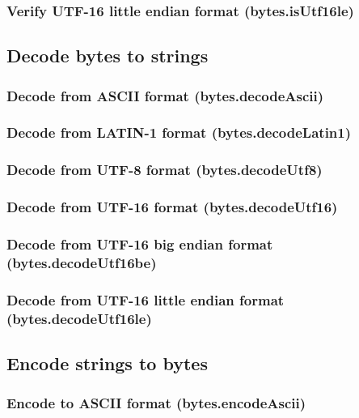 \documentclass{article}
\theoremstyle{definition}
\begin{document}
\subsubsection{Verify UTF-16 little endian format (bytes.isUtf16le)}

\subsection{Decode bytes to strings}

\subsubsection{Decode from ASCII format (bytes.decodeAscii)}

\subsubsection{Decode from LATIN-1 format (bytes.decodeLatin1)}

\subsubsection{Decode from UTF-8 format (bytes.decodeUtf8)}

\subsubsection{Decode from UTF-16 format (bytes.decodeUtf16)}

\subsubsection{Decode from UTF-16 big endian format (bytes.decodeUtf16be)}

\subsubsection{Decode from UTF-16 little endian format (bytes.decodeUtf16le)}

\subsection{Encode strings to bytes}

\subsubsection{Encode to ASCII format (bytes.encodeAscii)}
\end{document}

